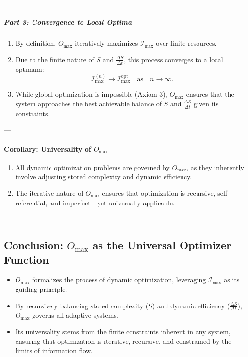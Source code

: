 \documentclass[12pt]{article}
\begin{document}
---

\subparagraph{Part 3: Convergence to Local Optima}
\begin{enumerate}
    \item By definition, \(O_{\text{max}}\) iteratively maximizes \(\mathcal{I}_{\text{max}}\) over finite resources.
    \item Due to the finite nature of \(S\) and \(\frac{\Delta S}{\Delta t}\), this process converges to a local optimum:
    \[
    \mathcal{I}_{\text{max}}^{(n)} \to \mathcal{I}_{\text{max}}^{\text{opt}} \quad \text{as} \quad n \to \infty.
    \]
    \item While global optimization is impossible (Axiom 3), \(O_{\text{max}}\) ensures that the system approaches the best achievable balance of \(S\) and \(\frac{\Delta S}{\Delta t}\) given its constraints.
\end{enumerate}

---

\paragraph{Corollary: Universality of \(O_{\text{max}}\)}
\begin{enumerate}
    \item All dynamic optimization problems are governed by \(O_{\text{max}}\), as they inherently involve adjusting stored complexity and dynamic efficiency.
    \item The iterative nature of \(O_{\text{max}}\) ensures that optimization is recursive, self-referential, and imperfect—yet universally applicable.
\end{enumerate}

---

\subsection{Conclusion: \(O_{\text{max}}\) as the Universal Optimizer Function}

\begin{itemize}
    \item \(O_{\text{max}}\) formalizes the process of dynamic optimization, leveraging \(\mathcal{I}_{\text{max}}\) as its guiding principle.
    \item By recursively balancing stored complexity (\(S\)) and dynamic efficiency (\(\frac{\Delta S}{\Delta t}\)), \(O_{\text{max}}\) governs all adaptive systems.
    \item Its universality stems from the finite constraints inherent in any system, ensuring that optimization is iterative, recursive, and constrained by the limits of information flow.
\end{itemize}
\end{document}
